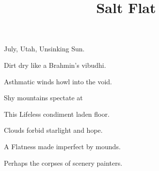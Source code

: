 \documentclass{article}
\title{Salt Flat}
\begin{document}
 \newline

July, Utah, Unsinking Sun.\newline

Dirt dry like a Brahmin's vibudhi.\newline

Asthmatic winds howl into the void.\newline

Shy mountains spectate at\newline

This Lifeless condiment laden floor.\newline

Clouds forbid starlight and hope.\newline

A Flatness made imperfect by mounds.\newline

Perhaps the corpses of scenery painters.\newline
\end{document}
